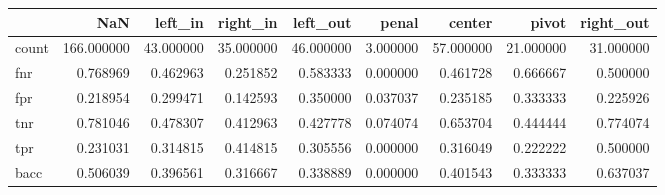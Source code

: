 \begin{tabular}{lrrrrrrrr}
\toprule
{} &         NaN &    left\_in &   right\_in &   left\_out &     penal &     center &      pivot &  right\_out \\
\midrule
count &  166.000000 &  43.000000 &  35.000000 &  46.000000 &  3.000000 &  57.000000 &  21.000000 &  31.000000 \\
fnr   &    0.768969 &   0.462963 &   0.251852 &   0.583333 &  0.000000 &   0.461728 &   0.666667 &   0.500000 \\
fpr   &    0.218954 &   0.299471 &   0.142593 &   0.350000 &  0.037037 &   0.235185 &   0.333333 &   0.225926 \\
tnr   &    0.781046 &   0.478307 &   0.412963 &   0.427778 &  0.074074 &   0.653704 &   0.444444 &   0.774074 \\
tpr   &    0.231031 &   0.314815 &   0.414815 &   0.305556 &  0.000000 &   0.316049 &   0.222222 &   0.500000 \\
bacc  &    0.506039 &   0.396561 &   0.316667 &   0.338889 &  0.000000 &   0.401543 &   0.333333 &   0.637037 \\
\bottomrule
\end{tabular}
